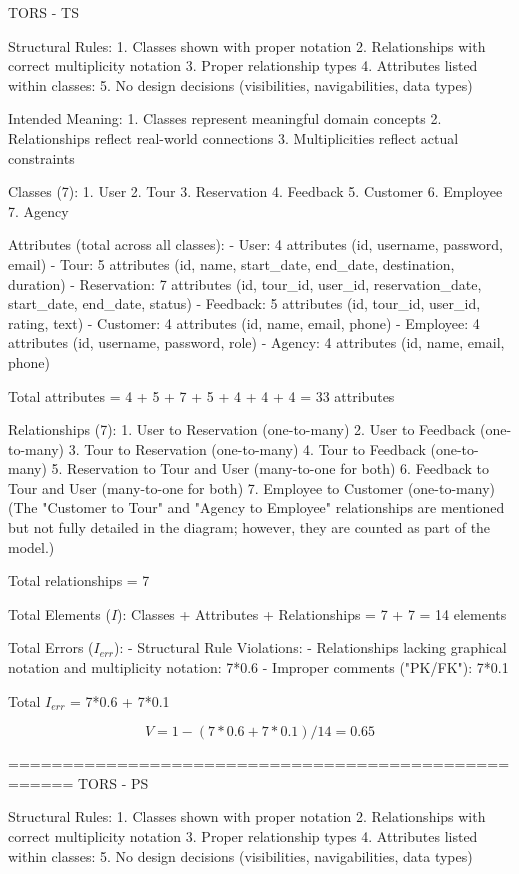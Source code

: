 TORS - TS

Structural Rules:
1. Classes shown with proper notation
2. Relationships with correct multiplicity notation
3. Proper relationship types
4. Attributes listed within classes: 
5. No design decisions (visibilities, navigabilities, data types)

Intended Meaning:
1. Classes represent meaningful domain concepts
2. Relationships reflect real-world connections
3. Multiplicities reflect actual constraints

Classes (7):
1. User
2. Tour
3. Reservation
4. Feedback
5. Customer
6. Employee
7. Agency

Attributes (total across all classes):
- User: 4 attributes (id, username, password, email)
- Tour: 5 attributes (id, name, start_date, end_date, destination, duration)
- Reservation: 7 attributes (id, tour_id, user_id, reservation_date, start_date, end_date, status)
- Feedback: 5 attributes (id, tour_id, user_id, rating, text)
- Customer: 4 attributes (id, name, email, phone)
- Employee: 4 attributes (id, username, password, role)
- Agency: 4 attributes (id, name, email, phone)

Total attributes = 4 + 5 + 7 + 5 + 4 + 4 + 4 = 33 attributes

Relationships (7):
1. User to Reservation (one-to-many)
2. User to Feedback (one-to-many)
3. Tour to Reservation (one-to-many)
4. Tour to Feedback (one-to-many)
5. Reservation to Tour and User (many-to-one for both)
6. Feedback to Tour and User (many-to-one for both)
7. Employee to Customer (one-to-many)
(The "Customer to Tour" and "Agency to Employee" relationships are mentioned but not fully detailed in the diagram; however, they are counted as part of the model.)

Total relationships = 7

Total Elements (\( I \)):
Classes + Attributes + Relationships = 7 + 7 = 14 elements

Total Errors (\( I_{err} \)):
- Structural Rule Violations:
- Relationships lacking graphical notation and multiplicity notation: 7*0.6
- Improper comments ("PK/FK"): 7*0.1

Total \( I_{err} \) = 7*0.6 + 7*0.1

\[
V = 1 - (7*0.6+ 7*0.1)/14= 0.65
\]

====================================================
TORS - PS

Structural Rules:
1. Classes shown with proper notation
2. Relationships with correct multiplicity notation
3. Proper relationship types
4. Attributes listed within classes: 
5. No design decisions (visibilities, navigabilities, data types)

